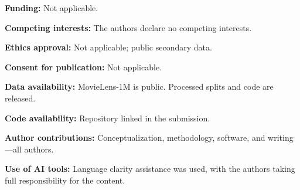 \documentclass[pdflatex,sn-mathphys-num]{sn-jnl}%
\theoremstyle{thmstyleone}%
\theoremstyle{thmstyletwo}%
\theoremstyle{thmstylethree}%
\begin{document}
\begin{declarations}
\item \textbf{Funding:} Not applicable.
\item \textbf{Competing interests:} The authors declare no competing interests.
\item \textbf{Ethics approval:} Not applicable; public secondary data.
\item \textbf{Consent for publication:} Not applicable.
\item \textbf{Data availability:} MovieLens-1M is public. Processed splits and code are released.
\item \textbf{Code availability:} Repository linked in the submission.
\item \textbf{Author contributions:} Conceptualization, methodology, software, and writing---all authors.
\item \textbf{Use of AI tools:} Language clarity assistance was used, with the authors taking full responsibility for the content.
\end{declarations}

%
\end{document}
